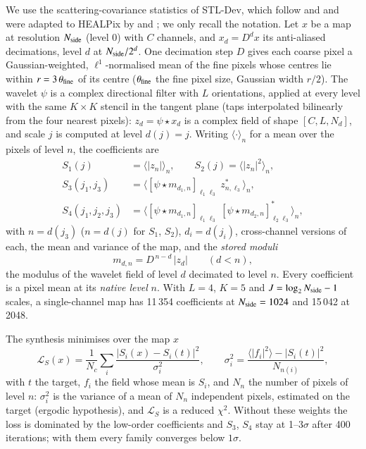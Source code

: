 \documentclass{aa}
\newcommand{\nside}{N_{\rm side}}
\begin{document}
We use the scattering-covariance statistics of STL-Dev, which follow \citet{morel2022} and \citet{cheng2024} and were adapted to HEALPix \citep{gorski2005} by \citet{delouis2022} and \citet{mousset2024}; we only recall the notation. Let $x$ be a map at resolution $\nside$ (level 0) with $C$ channels, and $x_d = D^d x$ its anti-aliased decimations, level $d$ at $\nside/2^d$. One decimation step $D$ gives each coarse pixel a Gaussian-weighted, $\ell^1$-normalised mean of the fine pixels whose centres lie within $r = 3\,\theta_{\rm fine}$ of its centre ($\theta_{\rm fine}$ the fine pixel size, Gaussian width $r/2$). The wavelet $\psi$ is a complex directional filter with $L$ orientations, applied at every level with the same $K\times K$ stencil in the tangent plane (taps interpolated bilinearly from the four nearest pixels): $z_d = \psi\star x_d$ is a complex field of shape $[C, L, N_d]$, and scale $j$ is computed at level $d(j)=j$. Writing $\langle\cdot\rangle_n$ for a mean over the pixels of level $n$, the coefficients are
\begin{align}
S_1(j) &= \langle |z_{n}| \rangle_n, \qquad S_2(j) = \langle |z_{n}|^2 \rangle_n, \\
S_3(j_1,j_3) &= \langle [\psi\star m_{d_1,n}]_{\ell_1\ell_3}\; z^*_{n,\ell_3} \rangle_n, \\
S_4(j_1,j_2,j_3) &= \langle [\psi\star m_{d_1,n}]_{\ell_1\ell_3}\; [\psi\star m_{d_2,n}]^*_{\ell_2\ell_3} \rangle_n,
\end{align}
with $n=d(j_3)$ ($n=d(j)$ for $S_1$, $S_2$), $d_i = d(j_i)$, cross-channel versions of each, the mean and variance of the map, and the \emph{stored moduli}
\begin{equation}
m_{d,n} = D^{\,n-d}\,|z_d| \qquad (d<n),
\label{eq:moduli}
\end{equation}
the modulus of the wavelet field of level $d$ decimated to level $n$. Every coefficient is a pixel mean at its \emph{native level} $n$. With $L=4$, $K=5$ and $J=\log_2\nside-1$ scales, a single-channel map has 11\,354 coefficients at $\nside=1024$ and 15\,042 at 2048.

The synthesis minimises over the map $x$
\begin{equation}
\mathcal{L}_S(x) = \frac{1}{N_c}\sum_{i} \frac{|S_i(x) - S_i(t)|^2}{\sigma_i^2}, \qquad \sigma_i^2 = \frac{\langle |f_{i}|^2\rangle - |S_i(t)|^2}{N_{n(i)}},
\label{eq:loss}
\end{equation}
with $t$ the target, $f_i$ the field whose mean is $S_i$, and $N_{n}$ the number of pixels of level $n$: $\sigma_i^2$ is the variance of a mean of $N_n$ independent pixels, estimated on the target (ergodic hypothesis), and $\mathcal{L}_S$ is a reduced $\chi^2$. Without these weights the loss is dominated by the low-order coefficients and $S_3$, $S_4$ stay at 1--3$\sigma$ after 400 iterations; with them every family converges below $1\sigma$.
\end{document}
